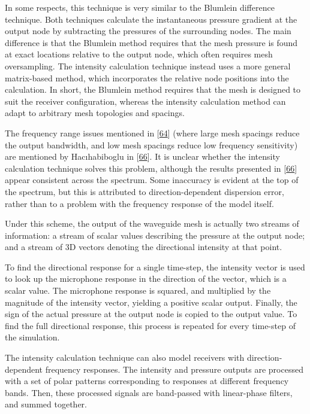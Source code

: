 \documentclass[]{scrreprt}
\begin{document}
In some respects, this technique is very similar to the Blumlein
difference technique. Both techniques calculate the instantaneous
pressure gradient at the output node by subtracting the pressures of the
surrounding nodes. The main difference is that the Blumlein method
requires that the mesh pressure is found at exact locations relative to
the output node, which often requires mesh oversampling. The intensity
calculation technique instead uses a more general matrix-based method,
which incorporates the relative node positions into the calculation. In
short, the Blumlein method requires that the mesh is designed to suit
the receiver configuration, whereas the intensity calculation method can
adapt to arbitrary mesh topologies and spacings.

The frequency range issues mentioned in
{[}\protect\hyperlink{ref-southernux5fmethodsux5f2007}{64}{]} (where
large mesh spacings reduce the output bandwidth, and low mesh spacings
reduce low frequency sensitivity) are mentioned by Hacıhabiboglu in
{[}\protect\hyperlink{ref-hacihabibogluux5fsimulationux5f2010}{66}{]}.
It is unclear whether the intensity calculation technique solves this
problem, although the results presented in
{[}\protect\hyperlink{ref-hacihabibogluux5fsimulationux5f2010}{66}{]}
appear consistent across the spectrum. Some inaccuracy is evident at the
top of the spectrum, but this is attributed to direction-dependent
dispersion error, rather than to a problem with the frequency response
of the model itself.

Under this scheme, the output of the waveguide mesh is actually two
streams of information: a stream of scalar values describing the
pressure at the output node; and a stream of 3D vectors denoting the
directional intensity at that point.

To find the directional response for a single time-step, the intensity
vector is used to look up the microphone response in the direction of
the vector, which is a scalar value. The microphone response is squared,
and multiplied by the magnitude of the intensity vector, yielding a
positive scalar output. Finally, the sign of the actual pressure at the
output node is copied to the output value. To find the full directional
response, this process is repeated for every time-step of the
simulation.

The intensity calculation technique can also model receivers with
direction-dependent frequency responses. The intensity and pressure
outputs are processed with a set of polar patterns corresponding to
responses at different frequency bands. Then, these processed signals
are band-passed with linear-phase filters, and summed together.
\end{document}
